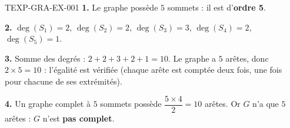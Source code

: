 \begin{corrige}{TEXP-GRA-EX-001}
\textbf{1.} Le graphe possède $5$ sommets : il est d'\textbf{ordre 5}.

\textbf{2.} $\deg(S_1)=2$, $\deg(S_2)=2$, $\deg(S_3)=3$, $\deg(S_4)=2$, $\deg(S_5)=1$.

\textbf{3.} Somme des degrés : $2+2+3+2+1=10$. Le graphe a $5$ arêtes, donc $2\times5=10$ : l'égalité est vérifiée (chaque arête est comptée deux fois, une fois pour chacune de ses extrémités).

\textbf{4.} Un graphe complet à $5$ sommets possède $\dfrac{5\times4}{2}=10$ arêtes. Or $G$ n'a que $5$ arêtes : $G$ n'est \textbf{pas complet}.
\end{corrige}
